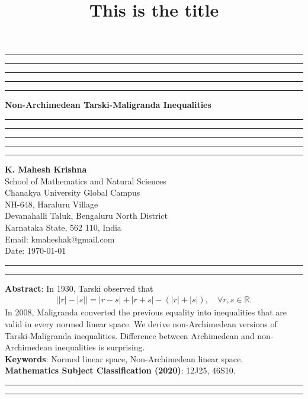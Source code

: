 \documentclass{amsart}
\title{This is the title}
\begin{document}
\hrule\hrule\hrule\hrule\hrule
\vspace{0.3cm}	
\begin{center}
{\bf\large{{Non-Archimedean Tarski-Maligranda Inequalities}}}\\
\vspace{0.3cm}
\hrule\hrule\hrule\hrule\hrule
\vspace{0.3cm}
\textbf{K. Mahesh Krishna}\\
School of Mathematics and Natural Sciences\\
Chanakya University Global Campus\\
NH-648, Haraluru Village\\
Devanahalli Taluk, 	Bengaluru  North District\\
Karnataka State, 562 110, India\\
Email: kmaheshak@gmail.com\\

Date: \today
\end{center}
\hrule\hrule
\vspace{0.5cm}
\textbf{Abstract}: In 1930, Tarski observed that 
\begin{align*}
	\bigg||r|-|s|\bigg|=|r-s|+ |r+s|-(|r|+|s|), \quad \forall r, s \in \mathbb{R}.
\end{align*}
 In 2008, Maligranda converted the previous equality into inequalities that are valid in every normed linear space. We derive non-Archimedean versions of Tarski-Maligranda inequalities. Difference between Archimedean and non-Archimedean inequalities is surprising.
 \\
\textbf{Keywords}: Normed linear space, Non-Archimedean linear space.\\
\textbf{Mathematics Subject Classification (2020)}:  12J25, 46S10.\\

\hrule


\hrule
\end{document}
